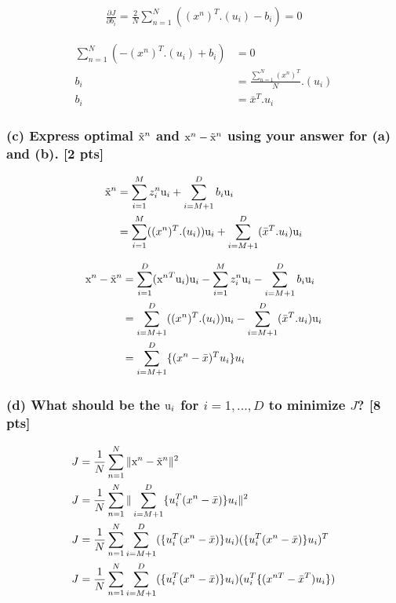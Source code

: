 \documentclass[twoside,10pt]{article}
\begin{document}
\begin{equation} \nonumber
\begin{split}
\frac{\partial J}{\partial b_i} = \frac{2}{N} \sum_{n=1}^N ((x^n)^T.(u_i) - b_i) =0
\end{split}
\end{equation}

\begin{equation} \nonumber
\begin{split}
\sum_{n=1}^N (-(x^n)^T.(u_i) + b_i) &= 0\\
b_i &= \frac{\sum_{n=1}^N (x^n)^T}{N}.(u_i)\\
b_i &= \bar{x}^T.u_i
\end{split}
\end{equation}

\subsubsection*{(c) Express optimal $\tilde{\text x}^n$ and $\text x^n - \tilde{\text x}^n$ using your answer for (a) and (b). [2 pts]}

\begin{equation} \nonumber
\begin{split}
\tilde{\text x}^n &= \sum_{i=1}^M z_i^n \text u_i + \sum_{i=M+1}^D b_i \text u_i \\
&= \sum_{i=1}^M ((x^n)^T.(u_i)) \text u_i + \sum_{i=M+1}^D (\bar{x}^T.u_i) \text u_i
\end{split}
\end{equation}

\begin{equation} \nonumber
\begin{split}
\text x^n - \tilde{\text x}^n &= \sum_{i=1}^D ({\text x^n}^T \text u_i) \text u_i - \sum_{i=1}^M z_i^n \text u_i - \sum_{i=M+1}^D b_i \text u_i \\
&= \sum_{i=M+1}^D ((x^n)^T.(u_i)) \text u_i - \sum_{i=M+1}^D (\bar{x}^T.u_i) \text u_i \\
&= \sum_{i=M+1}^D \{(x^n - \bar{x})^T u_i\} u_i
\end{split}
\end{equation}

\subsubsection*{(d) What should be the $\text u_i$ for $i=1, ..., D$ to minimize $J$? [8 pts]}

\begin{equation} \nonumber
\begin{split}
J &= \frac{1}{N} \sum_{n=1}^N \| \text x^n - \tilde{\text x}^n \|^2 \\
J &= \frac{1}{N} \sum_{n=1}^N \| \sum_{i=M+1}^D \{u_i^T (x^n - \bar{x})\} u_i \|^2 \\
J &= \frac{1}{N} \sum_{n=1}^N \sum_{i=M+1}^D (\{u_i^T (x^n - \bar{x})\} u_i)(\{u_i^T (x^n - \bar{x})\} u_i)^T \\
J &= \frac{1}{N} \sum_{n=1}^N \sum_{i=M+1}^D (\{u_i^T (x^n - \bar{x})\} u_i)( u_i^T \{(x^{nT} - \bar{x}^T)u_i\})
\end{split}
\end{equation}
\end{document}
